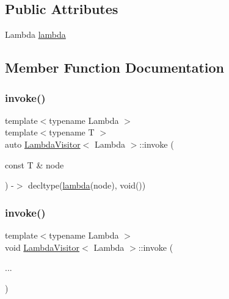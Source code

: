 \subsection*{Public Attributes}
\begin{DoxyCompactItemize}
\item 
Lambda \hyperlink{struct_lambda_visitor_a171d971bb3064e3b93c46916f51e4dc2}{lambda}
\end{DoxyCompactItemize}


\subsection{Member Function Documentation}
\mbox{\label{struct_lambda_visitor_a02b7b65a100c0f548592d1747a2b7ef8}} 
\subsubsection{\texorpdfstring{invoke()}{invoke()}\hspace{0.1cm}{\footnotesize\ttfamily [1/2]}}
{\footnotesize\ttfamily template$<$typename Lambda $>$ \\
template$<$typename T $>$ \\
auto \hyperlink{struct_lambda_visitor}{Lambda\+Visitor}$<$ Lambda $>$\+::invoke (\begin{DoxyParamCaption}\item[{const T \&}]{node }\end{DoxyParamCaption}) -\/$>$ decltype(\hyperlink{struct_lambda_visitor_a171d971bb3064e3b93c46916f51e4dc2}{lambda}(node), void())
  \hspace{0.3cm}{\ttfamily [inline]}}

\mbox{\label{struct_lambda_visitor_ab754a8920cef4d471d217ffe4f7f77f8}} 
\subsubsection{\texorpdfstring{invoke()}{invoke()}\hspace{0.1cm}{\footnotesize\ttfamily [2/2]}}
{\footnotesize\ttfamily template$<$typename Lambda $>$ \\
void \hyperlink{struct_lambda_visitor}{Lambda\+Visitor}$<$ Lambda $>$\+::invoke (\begin{DoxyParamCaption}\item[{}]{... }\end{DoxyParamCaption})\hspace{0.3cm}{\ttfamily [inline]}}



